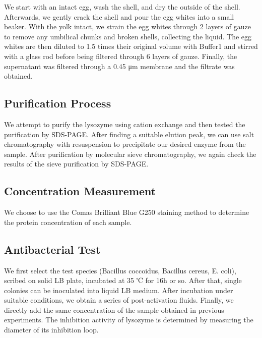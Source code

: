 We start with an intact egg, wash the shell, and dry the outside of the shell. Afterwards, we gently crack the shell and pour the egg whites into a small beaker. With the yolk intact, we strain the egg whites through 2 layers of gauze to remove any umbilical chunks and broken shells, collecting the liquid. The egg whites are then diluted to 1.5 times their original volume with Buffer1 and stirred with a glass rod before being filtered through 6 layers of gauze. Finally, the supernatant was filtered through a 0.45 μm membrane and the filtrate was obtained.

\hypertarget{purification-process}{%
\subsection{Purification Process}\label{purification-process}}

We attempt to purify the lysozyme using cation exchange and then tested the purification by SDS-PAGE. After finding a suitable elution peak, we can use salt chromatography with resuspension to precipitate our desired enzyme from the sample. After purification by molecular sieve chromatography, we again check the results of the sieve purification by SDS-PAGE.

\hypertarget{concentration-measurement}{%
\subsection{Concentration Measurement}\label{concentration-measurement}}

We choose to use the Comas Brilliant Blue G250 staining method to determine the protein concentration of each sample.

\hypertarget{antibacterial-test}{%
\subsection{Antibacterial Test}\label{antibacterial-test}}

We first select the test species (Bacillus coccoidus, Bacillus cereus, E. coli), scribed on solid LB plate, incubated at 35 ℃ for 16h or so. After that, single colonies can be inoculated into liquid LB medium. After incubation under suitable conditions, we obtain a series of post-activation fluids. Finally, we directly add the same concentration of the sample obtained in previous experiments. The inhibition activity of lysozyme is determined by measuring the diameter of its inhibition loop.


